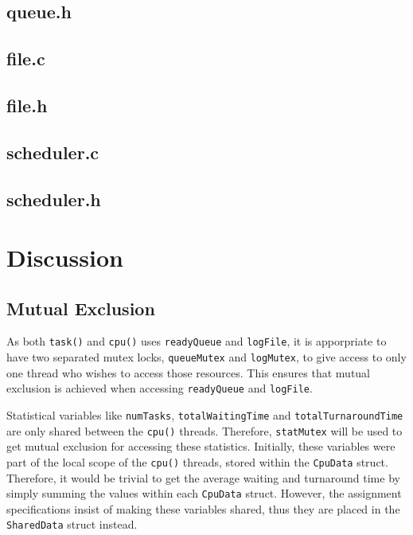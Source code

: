 \documentclass[a4paper, 12pt, titlepage]{article}
\newcommand{\code}[1]{\small\texttt{#1}\normalsize}
\begin{document}
\subsection{queue.h}

\newpage

\subsection{file.c}

\newpage

\subsection{file.h}

\newpage

\subsection{scheduler.c}

\newpage

\subsection{scheduler.h}

\newpage

\section{Discussion}

\subsection{Mutual Exclusion}
As both \code{task()} and \code{cpu()} uses \code{readyQueue} and
\code{logFile}, it is apporpriate to have two separated mutex locks,
\code{queueMutex} and \code{logMutex}, to give access to only one thread who
wishes to access those resources. This ensures that mutual exclusion is
achieved when accessing \code{readyQueue} and \code{logFile}.

Statistical variables like \code{numTasks}, \code{totalWaitingTime} and
\code{totalTurnaroundTime} are only shared between the \code{cpu()} threads.
Therefore, \code{statMutex} will be used to get mutual exclusion for accessing
these statistics. Initially, these variables were part of the local scope of
the \code{cpu()} threads, stored within the \code{CpuData} struct.  Therefore,
it would be trivial to get the average waiting and turnaround time by simply
summing the values within each \code{CpuData} struct. However, the assignment
specifications insist of making these variables shared, thus they are placed in
the \code{SharedData} struct instead.
\end{document}

